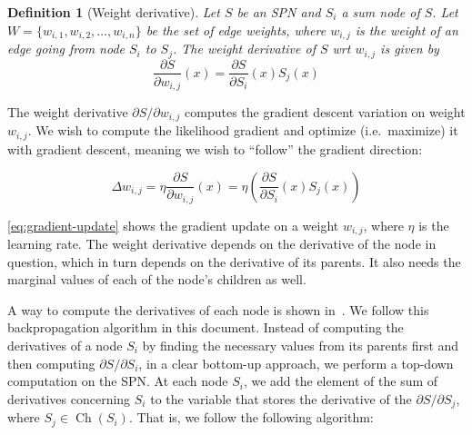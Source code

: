 \documentclass{amsart}
\DeclareMathOperator*{\Ch}{\text{Ch}}
\theoremstyle{plain}
\newcounter{dummy-def}\numberwithin{dummy-def}{section}
\newtheorem{definition}[dummy-def]{Definition}
\newcounter{dummy-thm}\numberwithin{dummy-thm}{section}
\newcounter{dummy-prop}\numberwithin{dummy-prop}{section}
\newcounter{dummy-corollary}\numberwithin{dummy-corollary}{section}
\newcounter{dummy-lemma}\numberwithin{dummy-lemma}{section}
\newcounter{dummy-ex}\numberwithin{dummy-ex}{section}
\newcounter{dummy-eg}\numberwithin{dummy-eg}{section}
\numberwithin{equation}{section}
\begin{document}
\begin{definition}[Weight derivative]
  Let $S$ be an SPN and $S_i$ a sum node of $S$. Let $W=\{w_{i,1},w_{i,2},\ldots,w_{i,n}\}$ be the
  set of edge weights, where $w_{i,j}$ is the weight of an edge going from node $S_i$ to $S_j$. The
  weight derivative of $S$ wrt $w_{i,j}$ is given by
  \begin{equation*}
    \frac{\partial S}{\partial w_{i,j}}(x) = \frac{\partial S}{\partial S_i}(x) S_j(x)
  \end{equation*}
\end{definition}

The weight derivative $\partial S/\partial w_{i,j}$ computes the gradient descent variation on
weight $w_{i,j}$. We wish to compute the likelihood gradient and optimize (i.e.\ maximize) it with
gradient descent, meaning we wish to ``follow'' the gradient direction:

\begin{equation}
  \Delta w_{i,j}=\eta\frac{\partial S}{\partial w_{i,j}}(x)=\eta\left(\frac{\partial S}{\partial
    S_i}(x)S_j(x)\right)
  \label{eq:gradient-update}
\end{equation}

\autoref{eq:gradient-update} shows the gradient update on a weight $w_{i,j}$, where $\eta$ is the
learning rate. The weight derivative depends on the derivative of the node in question, which in
turn depends on the derivative of its parents. It also needs the marginal values of each of the
node's children as well.

A way to compute the derivatives of each node is shown in~\cite{dspn-talk}. We follow this
backpropagation algorithm in this document. Instead of computing the derivatives of a node $S_i$ by
finding the necessary values from its parents first and then computing $\partial S/\partial S_i$,
in a clear bottom-up approach, we perform a top-down computation on the SPN\@. At each node $S_i$,
we add the element of the sum of derivatives concerning $S_i$ to the variable that stores the
derivative of the $\partial S/\partial S_j$, where $S_j\in\Ch(S_i)$. That is, we follow the
following algorithm:
\end{document}
